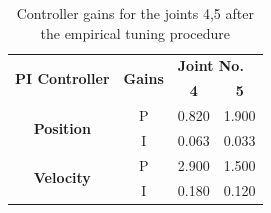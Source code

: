 \begin{table}[H]
\centering
\begin{tabular}{|c|c|l|l|}
\hline
\multirow{2}{*}{\textbf{PI Controller}} & \multicolumn{1}{l|}{\multirow{2}{*}{\textbf{Gains}}} & \multicolumn{2}{l|}{\textbf{Joint No.}}                           \\ \cline{3-4} 
                                        & \multicolumn{1}{l|}{}                                & \multicolumn{1}{c|}{\textbf{4}} & \multicolumn{1}{c|}{\textbf{5}} \\ \hline
\multirow{2}{*}{\textbf{Position}}      & P                                                    & 0.820                           & 1.900                           \\ \cline{2-4} 
                                        & I                                                    & 0.063                           & 0.033                           \\ \hline
\multirow{2}{*}{\textbf{Velocity}}      & P                                                    & 2.900                           & 1.500                           \\ \cline{2-4} 
                                        & I                                                    & 0.180                           & 0.120                           \\ \hline
\end{tabular}
\caption{Controller gains for the joints 4,5 after the empirical tuning procedure}
\end{table}

